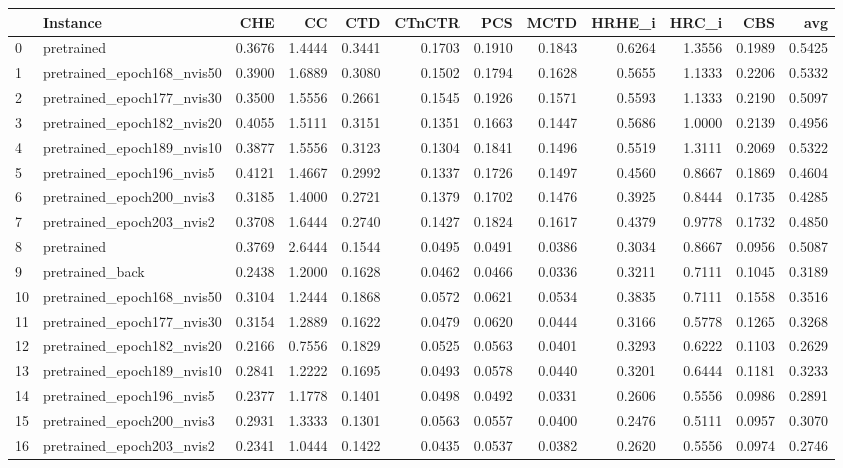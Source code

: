 \begin{tabular}{llrrrrrrrrrr}
\toprule
 & Instance & CHE & CC & CTD & CTnCTR & PCS & MCTD & HRHE_i & HRC_i & CBS & avg \\
\midrule
0 & pretrained & 0.3676 & 1.4444 & 0.3441 & 0.1703 & 0.1910 & 0.1843 & 0.6264 & 1.3556 & 0.1989 & 0.5425 \\
1 & pretrained_epoch168_nvis50 & 0.3900 & 1.6889 & 0.3080 & 0.1502 & 0.1794 & 0.1628 & 0.5655 & 1.1333 & 0.2206 & 0.5332 \\
2 & pretrained_epoch177_nvis30 & 0.3500 & 1.5556 & 0.2661 & 0.1545 & 0.1926 & 0.1571 & 0.5593 & 1.1333 & 0.2190 & 0.5097 \\
3 & pretrained_epoch182_nvis20 & 0.4055 & 1.5111 & 0.3151 & 0.1351 & 0.1663 & 0.1447 & 0.5686 & 1.0000 & 0.2139 & 0.4956 \\
4 & pretrained_epoch189_nvis10 & 0.3877 & 1.5556 & 0.3123 & 0.1304 & 0.1841 & 0.1496 & 0.5519 & 1.3111 & 0.2069 & 0.5322 \\
5 & pretrained_epoch196_nvis5 & 0.4121 & 1.4667 & 0.2992 & 0.1337 & 0.1726 & 0.1497 & 0.4560 & 0.8667 & 0.1869 & 0.4604 \\
6 & pretrained_epoch200_nvis3 & 0.3185 & 1.4000 & 0.2721 & 0.1379 & 0.1702 & 0.1476 & 0.3925 & 0.8444 & 0.1735 & 0.4285 \\
7 & pretrained_epoch203_nvis2 & 0.3708 & 1.6444 & 0.2740 & 0.1427 & 0.1824 & 0.1617 & 0.4379 & 0.9778 & 0.1732 & 0.4850 \\
8 & pretrained & 0.3769 & 2.6444 & 0.1544 & 0.0495 & 0.0491 & 0.0386 & 0.3034 & 0.8667 & 0.0956 & 0.5087 \\
9 & pretrained_back & 0.2438 & 1.2000 & 0.1628 & 0.0462 & 0.0466 & 0.0336 & 0.3211 & 0.7111 & 0.1045 & 0.3189 \\
10 & pretrained_epoch168_nvis50 & 0.3104 & 1.2444 & 0.1868 & 0.0572 & 0.0621 & 0.0534 & 0.3835 & 0.7111 & 0.1558 & 0.3516 \\
11 & pretrained_epoch177_nvis30 & 0.3154 & 1.2889 & 0.1622 & 0.0479 & 0.0620 & 0.0444 & 0.3166 & 0.5778 & 0.1265 & 0.3268 \\
12 & pretrained_epoch182_nvis20 & 0.2166 & 0.7556 & 0.1829 & 0.0525 & 0.0563 & 0.0401 & 0.3293 & 0.6222 & 0.1103 & 0.2629 \\
13 & pretrained_epoch189_nvis10 & 0.2841 & 1.2222 & 0.1695 & 0.0493 & 0.0578 & 0.0440 & 0.3201 & 0.6444 & 0.1181 & 0.3233 \\
14 & pretrained_epoch196_nvis5 & 0.2377 & 1.1778 & 0.1401 & 0.0498 & 0.0492 & 0.0331 & 0.2606 & 0.5556 & 0.0986 & 0.2891 \\
15 & pretrained_epoch200_nvis3 & 0.2931 & 1.3333 & 0.1301 & 0.0563 & 0.0557 & 0.0400 & 0.2476 & 0.5111 & 0.0957 & 0.3070 \\
16 & pretrained_epoch203_nvis2 & 0.2341 & 1.0444 & 0.1422 & 0.0435 & 0.0537 & 0.0382 & 0.2620 & 0.5556 & 0.0974 & 0.2746 \\
\bottomrule
\end{tabular}
